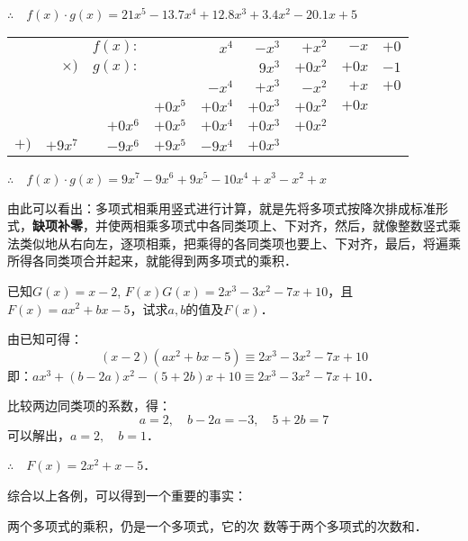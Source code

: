         $\therefore\quad f(x)\cdot g(x)=21x^5-13.7x^4+12.8x^3+3.4x^2-20.1x+5$

\begin{center}
    \begin{tabular}{rrrrrrrrr}
      &        &    $f(x):$    &        &    $x^4$    &    $-x^3$    &    $+x^2$    &    $-x$    &    $+0$\\
&    $\times)$    &    $g(x):$    &        &        &    $9x^3$    &    $+0x^2$    &    $+0x$    &    $-1$\\
\hline
&        &        &        &    $-x^4$    &    $+x^3$    &    $-x^2$    &    $+x$    &    $+0$\\
&        &        &    $+0x^5$    &    $+0x^4$    &    $+0x^3$    &    $+0x^2$    &    $+0x$    &    \\
&        &    $+0x^6$    &    $+0x^5$    &    $+0x^4$    &    $+0x^3$    &    $+0x^2$    &        &    \\
$+)$    &    $+9x^7$    &    $-9x^6$    &    $+9x^5$    &    $-9x^4$    &    $+0x^3$    &        &        &    \\
\hline
\end{tabular}
\end{center} 

        $\therefore\quad f(x)\cdot g(x)=9x^7-9x^6+9x^5-10x^4+x^3-x^2+x$

由此可以看出：多项式相乘用竖式进行计算，就是先将多项式按降次排成标准形式，\textbf{缺项补零}，并使两相乘多项式中各同类项上、下对齐，然后，就像整数竖式乘法类似地从右向左，逐项相乘，把乘得的各同类项也要上、下对齐，最后，将遍乘所得各同类项合并起来，就能得到两多项式的乘积．

\begin{example}
    已知$G(x)=x-2$, $F(x)G(x)=2x^3-3x^2-7x+10$，且$F(x)=ax^2+bx-5$，试求$a,b$的值及$F(x)$．
\end{example}

\begin{solution}
    由已知可得：
    \[(x-2)(ax^2+bx-5)\equiv 2x^3-3x^2-7x+10 \]
    即：$ax^3+(b-2a)x^2-(5+2b)x+10\equiv 2x^3-3x^2-7x+10$．

    比较两边同类项的系数，得：
    \[a=2,\quad b-2a=-3,\quad 5+2b=7 \]
    可以解出，$a=2,\quad b=1$．

    $\therefore\quad F(x)=2x^2+x-5$．
\end{solution}

综合以上各例，可以得到一个重要的事实：
\begin{blk}{}
    两个多项式的乘积，仍是一个多项式，它的次
数等于两个多项式的次数和．
\end{blk}

